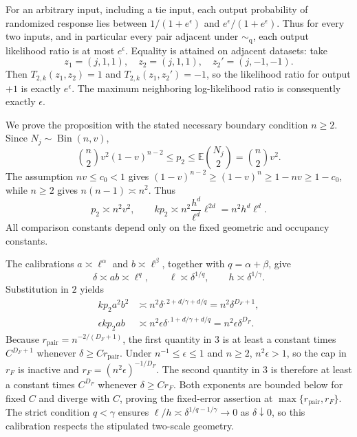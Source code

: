 For an arbitrary input, including a tie input, each output probability of randomized response lies between \(1/(1+e^\epsilon)\) and \(e^\epsilon/(1+e^\epsilon)\).  Thus for every two inputs, and in particular every pair adjacent under \(\sim_{\mathrm q}\), each output likelihood ratio is at most \(e^\epsilon\).  Equality is attained on adjacent datasets: take
\[
 z_1=(j,1,1),\quad z_2=(j,1,1),\quad z_2'=(j,-1,-1).
\]
Then \(T_{2,k}(z_1,z_2)=1\) and \(T_{2,k}(z_1,z_2')=-1\), so the likelihood ratio for output \(+1\) is exactly \(e^\epsilon\).  The maximum neighboring log-likelihood ratio is consequently exactly \(\epsilon\).

We prove the proposition with the stated necessary boundary condition \(n\ge2\).  Since \(N_j\sim\operatorname{Bin}(n,v)\),
\[
 \binom n2v^2(1-v)^{n-2}
 \le p_2
 \le \mathbb E\binom{N_j}{2}=\binom n2v^2. \tag{1}
\]
The assumption \(nv\le c_0<1\) gives
\((1-v)^{n-2}\ge(1-v)^n\ge1-nv\ge1-c_0\), while \(n\ge2\) gives \(n(n-1)\asymp n^2\).  Thus
\[
 p_2\asymp n^2v^2,
 \qquad
 kp_2\asymp n^2\frac{h^d}{\ell^d}\ell^{2d}
 =n^2h^d\ell^d. \tag{2}
\]
All comparison constants depend only on the fixed geometric and occupancy constants.

The calibrations \(a\asymp\ell^\alpha\) and \(b\asymp\ell^\beta\), together with \(q=\alpha+\beta\), give
\[
 \delta\asymp ab\asymp\ell^q,
 \qquad
 \ell\asymp\delta^{1/q},
 \qquad
 h\asymp\delta^{1/\gamma}.
\]
Substitution in \(2\) yields
\[
 \begin{aligned}
 kp_2a^2b^2
 &\asymp n^2\delta^{,2+d/\gamma+d/q}
   =n^2\delta^{D_F+1},\\
 \epsilon kp_2ab
 &\asymp n^2\epsilon\delta^{,1+d/\gamma+d/q}
   =n^2\epsilon\delta^{D_F}. \tag{3}
 \end{aligned}
\]
Because \(r_{\mathrm{pair}}=n^{-2/(D_F+1)}\), the first quantity in \(3\) is at least a constant times \(C^{D_F+1}\) whenever \(\delta\ge Cr_{\mathrm{pair}}\).  Under \(n^{-1}\le\epsilon\le1\) and \(n\ge2\), \(n^2\epsilon>1\), so the cap in \(r_F\) is inactive and \(r_F=(n^2\epsilon)^{-1/D_F}\).  The second quantity in \(3\) is therefore at least a constant times \(C^{D_F}\) whenever \(\delta\ge Cr_F\).  Both exponents are bounded below for fixed \(C\) and diverge with \(C\), proving the fixed-error assertion at \(\max\{r_{\mathrm{pair}},r_F\}\).  The strict condition \(q<\gamma\) ensures
\(\ell/h\asymp\delta^{1/q-1/\gamma}\to0\) as \(\delta\downarrow0\), so this calibration respects the stipulated two-scale geometry.

